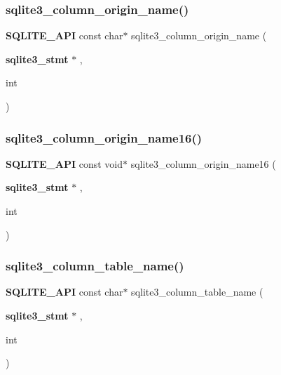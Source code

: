 \subsubsection{sqlite3\_column\_origin\_name()}
{\footnotesize\ttfamily \textbf{ S\+Q\+L\+I\+T\+E\+\_\+\+A\+PI} const char$\ast$ sqlite3\+\_\+column\+\_\+origin\+\_\+name (\begin{DoxyParamCaption}\item[{\textbf{ sqlite3\+\_\+stmt} $\ast$}]{,  }\item[{int}]{ }\end{DoxyParamCaption})}

\mbox{\label{sqlite3_8h_a9fd46431ea5f626b871589f4e601037b}} 
\subsubsection{sqlite3\_column\_origin\_name16()}
{\footnotesize\ttfamily \textbf{ S\+Q\+L\+I\+T\+E\+\_\+\+A\+PI} const void$\ast$ sqlite3\+\_\+column\+\_\+origin\+\_\+name16 (\begin{DoxyParamCaption}\item[{\textbf{ sqlite3\+\_\+stmt} $\ast$}]{,  }\item[{int}]{ }\end{DoxyParamCaption})}

\mbox{\label{sqlite3_8h_a11c90b3967d9597954386a72ab877d86}} 
\subsubsection{sqlite3\_column\_table\_name()}
{\footnotesize\ttfamily \textbf{ S\+Q\+L\+I\+T\+E\+\_\+\+A\+PI} const char$\ast$ sqlite3\+\_\+column\+\_\+table\+\_\+name (\begin{DoxyParamCaption}\item[{\textbf{ sqlite3\+\_\+stmt} $\ast$}]{,  }\item[{int}]{ }\end{DoxyParamCaption})}

\mbox{\label{sqlite3_8h_a16378a81b764000da8aa1d5898381af5}} 
